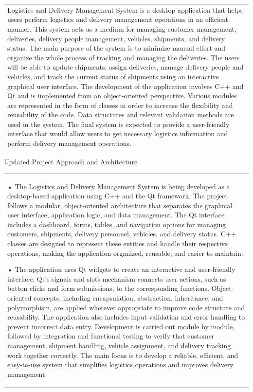 \documentclass[12pt,a4paper]{article}
\newcommand{\sectiontitle}[1]{%
    {\color{GEUBlue}
    \fontsize{18}{22}\selectfont #1}
}
\newcommand{\instruction}[1]{%
    {\color{InstructionGrey}
    \fontsize{10.5}{13}\selectfont #1}
}
\newcommand{\answerbox}[2]{%
    \begin{tabularx}{\textwidth}{
        |>{\raggedright\arraybackslash}X|}
        \hline
        \parbox[t][#1][t]{\dimexpr\linewidth-12pt\relax}{
            \vspace{5pt}
            \fontsize{11}{13}\selectfont #2
        }\\
        \hline
    \end{tabularx}
}
\begin{document}
\answerbox{6.0cm}{Logistics and Delivery Management System is a desktop application that helps users perform logistics and delivery management operations in an efficient manner. This system acts as a medium for managing customer management, deliveries, delivery people management, vehicles, shipments, and delivery status.
The main purpose of the system is to minimize manual effort and organize the whole process of tracking and managing the deliveries. The users will be able to update shipments, assign deliveries, manage delivery people and vehicles, and track the current status of shipments using an interactive graphical user interface.
The development of the application involves C++ and Qt and is implemented from an object-oriented perspective. Various modules are represented in the form of classes in order to increase the flexibility and reusability of the code. Data structures and relevant validation methods are used in the system.
The final system is expected to provide a user-friendly interface that would allow users to get necessary logistics information and perform delivery management operations.}

\vspace{0.70cm}

\sectiontitle{Updated Project Approach and Architecture }

\vspace{0.05cm}

\instruction{

}

\vspace{0.25cm}

\answerbox{6.75cm}{• The Logistics and Delivery Management System is being developed as a desktop-based application using C++ and the Qt framework. The project follows a modular, object-oriented architecture that separates the graphical user interface, application logic, and data management. The Qt interface includes a dashboard, forms, tables, and navigation options for managing customers, shipments, delivery personnel, vehicles, and delivery status. C++ classes are designed to represent these entities and handle their respective operations, making the application organized, reusable, and easier to maintain.


• The application uses Qt widgets to create an interactive and user-friendly interface. Qt's signals and slots mechanism connects user actions, such as button clicks and form submissions, to the corresponding functions. Object-oriented concepts, including encapsulation, abstraction, inheritance, and polymorphism, are applied wherever appropriate to improve code structure and reusability. The application also includes input validation and error handling to prevent incorrect data entry. Development is carried out module by module, followed by integration and functional testing to verify that customer management, shipment handling, vehicle assignment, and delivery tracking work together correctly. The main focus is to develop a reliable, efficient, and easy-to-use system that simplifies logistics operations and improves delivery management.}
\end{document}
